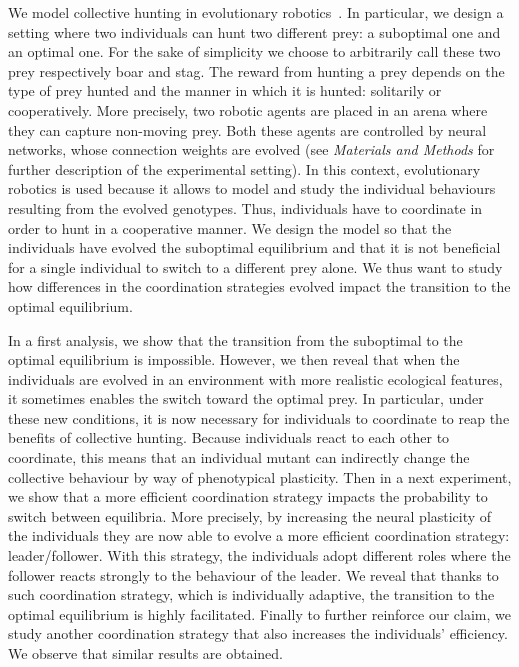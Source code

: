   We model collective hunting in evolutionary robotics~\parencite{Nolfi2000, Doncieux2015a}. In particular, we design a setting where two individuals can hunt two different prey: a suboptimal one and an optimal one. For the sake of simplicity we choose to arbitrarily call these two prey respectively boar and stag. The reward from hunting a prey depends on the type of prey hunted and the manner in which it is hunted: solitarily or cooperatively. More precisely, two robotic agents are placed in an arena where they can capture non-moving prey. Both these agents are controlled by neural networks, whose connection weights are evolved (see \emph{Materials and Methods} for further description of the experimental setting). In this context, evolutionary robotics is used because it allows to model and study the individual behaviours resulting from the evolved genotypes. Thus, individuals have to coordinate in order to hunt in a cooperative manner. We design the model so that the individuals have evolved the suboptimal equilibrium and that it is not beneficial for a single individual to switch to a different prey alone. We thus want to study how differences in the coordination strategies evolved impact the transition to the optimal equilibrium.

  In a first analysis, we show that the transition from the suboptimal to the optimal equilibrium is impossible. However, we then reveal that when the individuals are evolved in an environment with more realistic ecological features, it sometimes enables the switch toward the optimal prey. In particular, under these new conditions, it is now necessary for individuals to coordinate to reap the benefits of collective hunting. Because individuals react to each other to coordinate, this means that an individual mutant can indirectly change the collective behaviour by way of phenotypical plasticity. Then in a next experiment, we show that a more efficient coordination strategy impacts the probability to switch between equilibria. More precisely, by increasing the neural plasticity of the individuals they are now able to evolve a more efficient coordination strategy: leader/follower. With this strategy, the individuals adopt different roles where the follower reacts strongly to the behaviour of the leader. We reveal that thanks to such coordination strategy, which is individually adaptive, the transition to the optimal equilibrium is highly facilitated. Finally to further reinforce our claim, we study another coordination strategy that also increases the individuals' efficiency. We observe that similar results are obtained.



